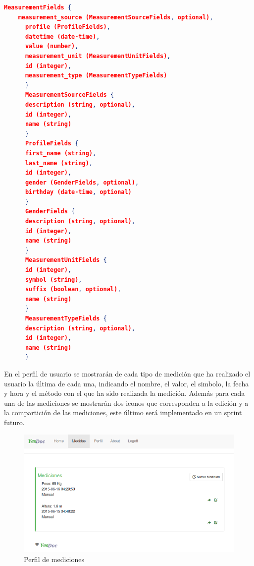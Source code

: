 \documentclass[a4paper,12pt]{article}
\begin{document}
    \begin{lstlisting}[language=json,firstnumber=1]
          MeasurementFields {
	measurement_source (MeasurementSourceFields, optional),
      profile (ProfileFields),
      datetime (date-time),
      value (number),
      measurement_unit (MeasurementUnitFields),
      id (integer),
      measurement_type (MeasurementTypeFields)
      }
      MeasurementSourceFields {
      description (string, optional),
      id (integer),
      name (string)
      }
      ProfileFields {
      first_name (string),
      last_name (string),
      id (integer),
      gender (GenderFields, optional),
      birthday (date-time, optional)
      }
      GenderFields {
      description (string, optional),
      id (integer),
      name (string)
      }
      MeasurementUnitFields {
      id (integer),
      symbol (string),
      suffix (boolean, optional),
      name (string)
      }
      MeasurementTypeFields {
      description (string, optional),
      id (integer),
      name (string)
      } 
    \end{lstlisting}

    En el perfil de usuario se mostrarán de cada tipo de medición que ha realizado el usuario la última de cada una, indicando el nombre, el valor, el simbolo, la fecha y hora y el método con el que ha sido realizada la medición. Además para cada una de las mediciones se mostrarán dos iconos que corresponden a la edición y a la compartición de las mediciones, este último será implementado en un sprint futuro.

    \begin{figure}[h]
        \centering
        \includegraphics[width=1\textwidth]{img/2-perfil_medicion}
        \caption{Perfil de mediciones}
		\label{perfil_medicion}
    \end{figure}
    
\end{document}
